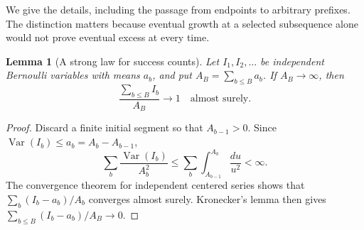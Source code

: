 \documentclass[11pt,letterpaper]{article}
\newtheorem{lemma}[theorem]{Lemma}
\theoremstyle{definition}
\DeclareMathOperator{\Var}{Var}
\begin{document}
We give the details, including the passage from endpoints to arbitrary
prefixes.  The distinction matters because eventual growth at a selected
subsequence alone would not prove eventual excess at every time.

\begin{lemma}[A strong law for success counts]\label{mbg:insp:con-bernoulli-slln}
Let $I_1,I_2,\ldots$ be independent Bernoulli variables with means
$a_b$, and put $A_B=\sum_{b\leq B}a_b$.  If $A_B\to\infty$, then
\[
 \frac{\sum_{b\leq B} I_b}{A_B}\longrightarrow1
 \quad\text{almost surely}.
\]
\end{lemma}

\begin{proof}
Discard a finite initial segment so that $A_{b-1}>0$.  Since
$\Var(I_b)\leq a_b=A_b-A_{b-1}$,
\[
 \sum_b\frac{\Var(I_b)}{A_b^2}
 \leq\sum_b\int_{A_{b-1}}^{A_b}\frac{du}{u^2}<\infty.
\]
The convergence theorem for independent centered series shows that
$\sum_b(I_b-a_b)/A_b$ converges almost surely.  Kronecker's lemma then gives
$\sum_{b\leq B}(I_b-a_b)/A_B\to0$.
\end{proof}
\end{document}
